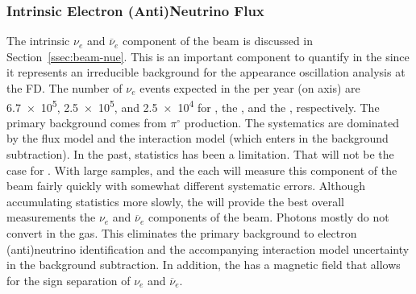 \subsubsection{Intrinsic Electron (Anti)Neutrino Flux}
The intrinsic $\nu_{e}$ and $\overline{\nu}_{e}$ component of the beam is 
discussed in Section~\ref{ssec:beam-nue}.  This is an important component to quantify in the   since it represents an irreducible background for the appearance oscillation analysis at the FD.  The number of  $\nu_{e}$ events expected in the  per year (on axis) are \num{6.7e5}, \num{2.5e5}, and \num{2.5e4} for , the , and the , respectively.  The primary background comes from $\pi^{\circ}$ production.  The systematics are dominated by the flux model and the interaction model (which enters in the background subtraction).  In the past, statistics has been a limitation.  That will not be the case for  .  With large samples,  and the  each will measure this component of the beam fairly quickly with somewhat different systematic errors.  Although accumulating statistics more slowly, the  will provide the best overall measurements the $\nu_{e}$ and $\overline{\nu}_{e}$ components of the beam.  Photons mostly do not convert in the gas.  This eliminates the primary background to electron (anti)neutrino identification and the accompanying interaction model uncertainty in the background subtraction.  In addition, the  has a magnetic field that allows for the sign separation of $\nu_{e}$ and $\overline{\nu}_{e}$.  


